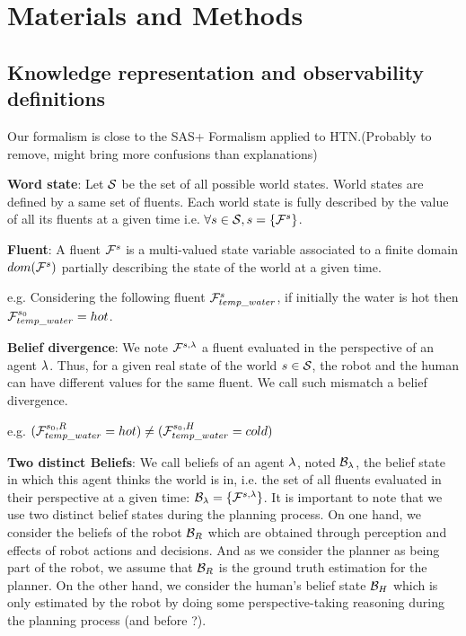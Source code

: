\documentclass[letterpaper]{article} %
\begin{document}
\section{Materials and Methods}



\subsection{Knowledge representation and observability definitions}

Our formalism is close to the SAS+ Formalism applied to HTN.(Probably to remove, might bring more confusions than explanations)

\textbf{Word state}: 
Let $\mathcal{S}$ be the set of all possible world states. World states are defined by a same set of fluents. Each world state is fully described by the value of all its fluents at a given time i.e. $\forall s\in\mathcal{S}, s=\{ \mathcal{F}^{s}_{} \}$.

\textbf{Fluent}: 
A fluent $\mathcal{F}^{s}_{}$ is a multi-valued state variable associated to a finite domain $dom(\mathcal{F}^{s}_{})$ partially describing the state of the world at a given time.


e.g. Considering the following fluent $\mathcal{F}^{s}_{temp\_water}$, if initially the water is hot then $\mathcal{F}^{s_0}_{temp\_water}=hot$.

\textbf{Belief divergence}: 
We note $\mathcal{F}^{s,\lambda}_{}$ a fluent evaluated in the perspective of an agent $\lambda$. Thus, for a given real state of the world $s\in\mathcal{S}$, the robot and the human can have different values for the same fluent. We call such mismatch a belief divergence.

e.g. $(\mathcal{F}^{s_0,R}_{temp\_water}{}=hot) \neq (\mathcal{F}^{s_0,H}_{temp\_water}=cold)$

\textbf{Two distinct Beliefs}: 
We call beliefs of an agent $\lambda$, noted $\mathcal{B}_\lambda$, the belief state in which this agent thinks the world is in, i.e. the set of all fluents evaluated in their perspective at a given time: $\mathcal{B}_\lambda=\{ \mathcal{F}^{s,\lambda}_{} \}$. It is important to note that we use two distinct belief states during the planning process. On one hand, we consider the beliefs of the robot $\mathcal{B}_R$ which are obtained through perception and effects of robot actions and decisions. And as we consider the planner as being part of the robot, we assume that $\mathcal{B}_R$ is the ground truth estimation for the planner. On the other hand, we consider the human's belief state $\mathcal{B}_H$ which is only estimated by the robot by doing some perspective-taking reasoning during the planning process (and before ?).
\end{document}
